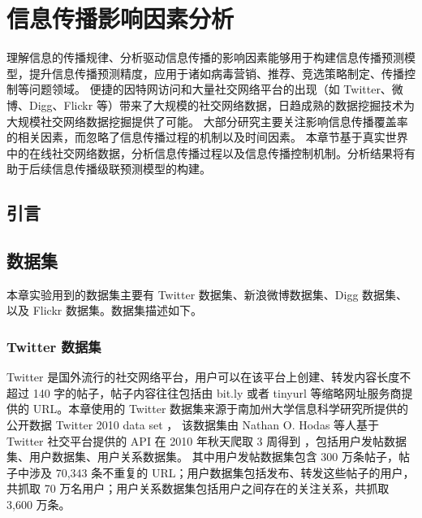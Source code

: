 \baselineskip 20pt

\chapter{信息传播影响因素分析}
\label{chap:3}

理解信息的传播规律、分析驱动信息传播的影响因素能够用于构建信息传播预测模型，提升信息传播预测精度，应用于诸如病毒营销\cite{leskovec2007dynamics}、推荐\cite{wu2019dual}、竞选策略制定\cite{bond201261}、传播控制\cite{zhao2019online}等问题领域。 
便捷的因特网访问和大量社交网络平台的出现（如 Twitter、微博、Digg、Flickr 等）带来了大规模的社交网络数据，日趋成熟的数据挖掘技术为大规模社交网络数据挖掘提供了可能。
大部分研究主要关注影响信息传播覆盖率的相关因素，而忽略了信息传播过程的机制以及时间因素\cite{zhang2017big}。
本章节基于真实世界中的在线社交网络数据，分析信息传播过程以及信息传播控制机制。分析结果将有助于后续信息传播级联预测模型的构建。

\section{引言}







\section{数据集}

本章实验用到的数据集主要有 Twitter 数据集、新浪微博数据集、Digg 数据集、以及 Flickr 数据集。数据集描述如下。


\subsection{Twitter 数据集}
Twitter 是国外流行的社交网络平台，用户可以在该平台上创建、转发内容长度不超过 140 字的帖子，帖子内容往往包括由 bit.ly 或者 tinyurl 等缩略网址服务商提供的 URL。本章使用的 Twitter 数据集来源于南加州大学信息科学研究所提供的公开数据 Twitter 2010 data set \cite{twitterdata}，
该数据集由 Nathan O. Hodas 等人基于 Twitter 社交平台提供的 API 在 2010 年秋天爬取 3 周得到 \cite{hodas2014simple}，包括用户发帖数据集、用户数据集、用户关系数据集。
其中用户发帖数据集包含 300 万条帖子，帖子中涉及 70,343 条不重复的 URL；用户数据集包括发布、转发这些帖子的用户，共抓取 70 万名用户；用户关系数据集包括用户之间存在的关注关系，共抓取 3,600 万条。
 
